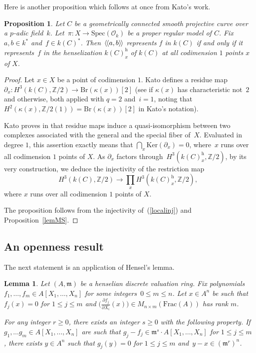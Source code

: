 \documentclass{amsart}
\newtheorem{prop}[thm]{Proposition}
\newtheorem{lem}[thm]{Lemma}
\theoremstyle{definition}
\theoremstyle{remark}
\numberwithin{equation}{section}
\newcommand{\Ker}{\mathrm{Ker}}
\newcommand{\Spec}{\mathrm{Spec}}
\newcommand{\Frac}{\mathrm{Frac}}
\newcommand{\Br}{\mathrm{Br}}
\newcommand{\h}{\mathrm{h}}
\newcommand{\llangle}{\langle\kern-.1em\langle}
\newcommand{\rrangle}{\rangle\kern-.1em\rangle}
\def\Z{\mathbb Z}
\def\cO{\mathcal{O}}
\def\km{\mathfrak{m}}
\begin{document}
Here is another proposition which follows at once from Kato's work.

\begin{prop}
\label{local}
Let $C$ be a geometrically connected smooth projective curve over a $p$-adic field~$k$. Let~$\pi:X\to \Spec(\cO_k)$ be a proper regular model of $C$. Fix~$a,b\in k^*$ and~$f\in k(C)^*$.
Then~$\llangle a,b\rrangle$ represents $f$ in $k(C)$ if and only if it represents~$f$ in the henselization $k(C)^{\h}_x$ of $k(C)$ at all codimension $1$ points $x$ of $X$.
\end{prop}

\begin{proof}
Let $x\in X$ be a point of codimension $1$. Kato defines a residue map ${\partial_x:H^3(k(C),\Z/2)\to\Br(\kappa(x))[2]}$ (see \cite[(i)~p.\,149]{Kato} if $\kappa(x)$ has characteristic not~$2$ and \cite[(ii) p.\,150]{Kato} otherwise, both applied with $q=2$ and~$i=1$, noting that $H^2(\kappa(x),\Z/2(1))=\Br(\kappa(x))[2]$ in Kato's notation).

Kato proves in \cite[Proposition 5.2]{Kato} that residue maps induce a quasi-isomor\-phism between two complexes associated with the general and the special fiber of~$X$. Evaluated in degree $1$, this assertion exactly means that $\bigcap_x\Ker(\partial_x)=0$, where~$x$ runs over all codimension $1$ points of $X$. As $\partial_x$ factors through~$H^3(k(C)^{\h}_x,\Z/2)$, by its very construction,
we deduce the injectivity of the restriction map 
\begin{equation}
\label{localinj}
H^3(k(C),\Z/2)\to\prod_x H^3(k(C)^{\h}_x,\Z/2),
\end{equation}
where $x$ runs over all codimension $1$ points of $X$.

The proposition follows from  the injectivity of~(\ref{localinj}) and Proposition~\ref{lemMS}.
\end{proof}


\subsection{An openness result}

The next statement is an application of Hensel's lemma.

\begin{lem}
\label{Hensel}
Let $(A,\km)$ be a
henselian discrete valuation ring.
Fix polynomials $f_1,\dots,f_m\in A[X_1,\dots, X_n]$ for some integers~$0\leq m\leq n$. Let $x\in A^n$  be such that~$f_j(x)=0$ for $1\leq j\leq m$ and $\big(\frac{\partial f_j}{\partial X_i}(x)\big)\in M_{n\times m}(\Frac(A))$ has rank $m$.

 For any integer $r\geq 0$, there exists an integer $s\geq 0$ with the following property.
 If ${g_1,\dots g_m\in A[X_1,\dots,X_n]}$ are such that $g_j-f_j\in\km^s\cdot A[X_1,\dots,X_n]$ for $1\leq j\leq m$, there exists $y\in A^n$ such that $g_j(y)=0$ for $1\leq j\leq m$ and~$y-x\in (\km^r)^n$.
\end{lem}
\end{document}
